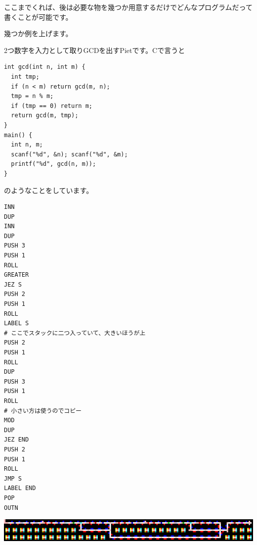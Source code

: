 ここまでくれば、後は必要な物を幾つか用意するだけでどんなプログラムだって書くことが可能です。

幾つか例を上げます。

2つ数字を入力として取りGCDを出すPietです。Cで言うと
\begin{lstlisting}[frame=single]
int gcd(int n, int m) {
  int tmp;
  if (n < m) return gcd(m, n);
  tmp = n % m;
  if (tmp == 0) return m;
  return gcd(m, tmp);
}
main() {
  int n, m;
  scanf("%d", &n); scanf("%d", &m);
  printf("%d", gcd(n, m));
}
\end{lstlisting}
のようなことをしています。
\begin{lstlisting}[frame=single]
INN
DUP
INN
DUP
PUSH 3
PUSH 1
ROLL
GREATER
JEZ S
PUSH 2
PUSH 1
ROLL
LABEL S
# ここでスタックに二つ入っていて、大きいほうが上
PUSH 2
PUSH 1
ROLL
DUP
PUSH 3
PUSH 1
ROLL
# 小さい方は使うのでコピー
MOD
DUP
JEZ END
PUSH 2
PUSH 1
ROLL
JMP S
LABEL END
POP
OUTN
\end{lstlisting}

\includegraphics[width=\textwidth]{images/6c82e735b7bd782e1f328f3d309c1286.png}
